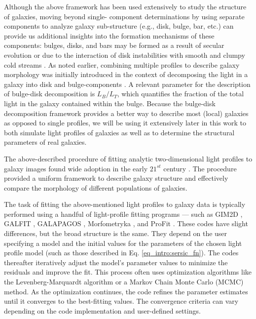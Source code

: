 Although the above framework has been used extensively to study the structure of galaxies, moving beyond single-\sersic{} component determinations by using separate components to analyze galaxy sub-structure (e.g., disk, bulge, bar, etc.) can provide us additional insights into the formation mechanisms of these components: bulges, disks, and bars may be formed as a result of secular evolution \citep[e.g.,][]{kormendy_2004, genzel_2008, sellwood_2014} or due to the interaction of disk instabilities with smooth and clumpy cold streams \citep[e.g.,][]{dekel_09a,dekel_09b}. As noted earlier, combining multiple \sersic{} profiles to describe galaxy morphology was initially introduced in the context of decomposing the light in a galaxy into disk and bulge-components \citep{kormendy_1979}. A relevant parameter for the description of bulge-disk decomposition is $L_B/L_T$, which quantifies the fraction of the total light in the galaxy contained within the bulge. Because the bulge-disk decomposition framework provides a better way to describe most (local) galaxies as opposed to single \sersic{} profiles, we will be using it extensively later in this work to both simulate light profiles of galaxies as well as to determine the structural parameters of real galaxies.

The above-described procedure of fitting analytic two-dimensional light profiles to galaxy images found wide adoption in the early $21^{st}$ century \citep[e.g.,][]{graham_03, kormendy_09, simard_11,vdw_12}. The procedure provided a uniform framework to describe galaxy structure and effectively compare the morphology of different populations of galaxies. 

The task of fitting the above-mentioned light profiles to galaxy data is typically performed using a handful of light-profile fitting programs --- such as GIM2D \citep{gim2d}, GALFIT \citep{galfit}, GALAPAGOS \citep{galapagos}, Morfometryka \citep{morfometryka}, and ProFit \citep{profit}. These codes have slight differences, but the broad structure is the same. They depend on the user specifying a model and the initial values for the parameters of the chosen light profile model (such as those described in Eq. \ref{eq_intro:sersic_fn}). The codes thereafter iteratively adjust the  model's parameter values to minimize the residuals and improve the fit. This process often uses optimization algorithms like the Levenberg-Marquardt algorithm or a Markov Chain Monte Carlo (MCMC) method. As the optimization continues, the code refines the parameter estimates until it converges to the best-fitting values. The convergence criteria can vary depending on the code implementation and user-defined settings.

